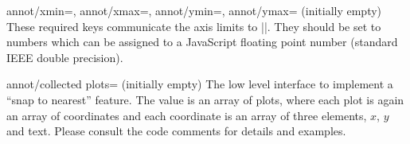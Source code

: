 \begin{pgfplotskeylist}{%
    annot/xmin=,
    annot/xmax=,
    annot/ymin=,
    annot/ymax= (initially empty)%
}
    These required keys communicate the axis limits to
    |\pgfplotsclickablecreate|. They should be set to numbers which can be
    assigned to a JavaScript floating point number (standard IEEE double
    precision).
\end{pgfplotskeylist}

\begin{pgfplotskey}{annot/collected plots= (initially empty)}
    The low level interface to implement a ``snap to nearest'' feature. The
    value is an array of plots, where each plot is again an array of
    coordinates and each coordinate is an array of three elements, $x$, $y$ and
    text. Please consult the code comments for details and examples.
\end{pgfplotskey}
\endgroup
